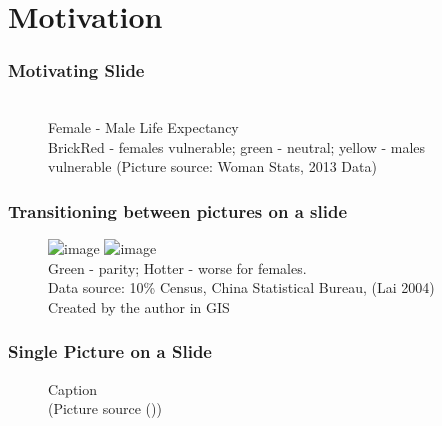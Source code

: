 \section{Motivation} 


\begin{frame}[label=motivatingslide]
\frametitle{Motivating Slide }
\begin{figure}[H]  %
\\
{\tiny Female - Male Life Expectancy\\
BrickRed - females vulnerable; green - neutral; yellow - males vulnerable}
\tiny{(Picture source: Woman Stats, 2013 Data)}
\label{fig:speciation}
\end{figure}
\end{frame}


\begin{frame}[label = pictransition]
\frametitle{Transitioning between pictures on a slide }
\begin{figure}
    \begin{center}
\includegraphics<1>[width=.7\linewidth]{figures/ECON-412/gdp_pc_le_1950.png}
\includegraphics<2>[width=.7\linewidth]{figures/ECON-412/gdp_pc_le_2019.png}
\\
{\tiny Green - parity; Hotter - worse for females.\\
Data source: 10\% Census, China Statistical Bureau, (Lai 2004)\\
Created by the author in GIS}
    \end{center}
\end{figure}
\end{frame}


\begin{frame}
\frametitle{Single Picture on a Slide}
\begin{figure}[H]  %
\caption{Caption\\
\bigskip
\small{(Picture source ())}}
\end{figure}
\end{frame}

